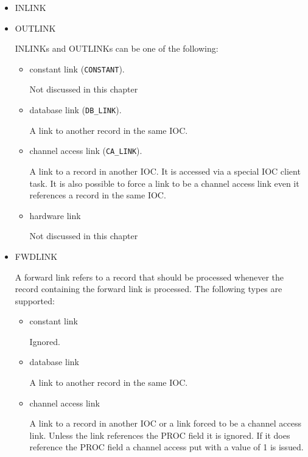 \begin{itemize}
\item {}INLINK
\item {}OUTLINK

INLINKs and OUTLINKs can be one of the following:

\begin{itemize}
\item {} constant link (\verb|CONSTANT|).

Not discussed in this chapter

\item {}database link (\verb|DB_LINK|).

A link to another record in the same IOC.

\item {}channel access link (\verb|CA_LINK|).

A link to a record in another IOC.
It is accessed via a special IOC client task.
It is also possible to force a link to be a channel access link even it references a record in the same IOC.

\item hardware link

Not discussed in this chapter

\end{itemize}

\item {}FWDLINK

A forward link refers to a record that should be processed whenever the record containing the forward link is processed.
The following types are supported:

\begin{itemize}

\item constant link

Ignored.

\item database link

A link to another record in the same IOC.

\item channel access link

A link to a record in another IOC or a link forced to be a channel access link.
Unless the link references the PROC field it is ignored.
If it does reference the PROC field a channel access put with a value of 1 is issued.

\end{itemize}
\end{itemize}

